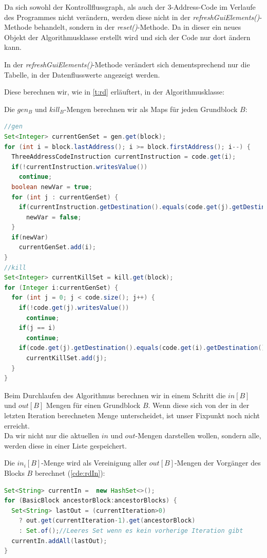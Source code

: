 Da sich sowohl der Kontrollflussgraph, als auch der 3-Address-Code im
Verlaufe des Programmes nicht verändern, werden diese nicht in der
\textit{refreshGuiElements()}-Methode behandelt, sondern in der \textit{reset()}-Methode.
Da in dieser ein neues Objekt der Algorithmusklasse erstellt wird und
sich der Code nur dort ändern kann.

In der \textit{refreshGuiElements()}-Methode verändert sich dementsprechend
nur die Tabelle, in der Datenflusswerte angezeigt werden.

Diese berechnen wir, wie in \cref{t:rd} erläuftert, in der Algorithmusklasse:

Die $gen_B$ und $kill_B$-Mengen berechnen wir als Maps für jeden Grundblock $B$: 
\begin{lstlisting}[language=Java, caption={Berechnung einer $gen$ und $kill$-Menge}, label={cde:gen}]
//gen
Set<Integer> currentGenSet = gen.get(block);
for (int i = block.lastAddress(); i >= block.firstAddress(); i--) {
  ThreeAddressCodeInstruction currentInstruction = code.get(i);
  if(!currentInstruction.writesValue())
    continue;
  boolean newVar = true;
  for (int j : currentGenSet) {
    if(currentInstruction.getDestination().equals(code.get(j).getDestination()))
      newVar = false;
  }
  if(newVar)
    currentGenSet.add(i);
}
//kill
Set<Integer> currentKillSet = kill.get(block);
for (Integer i:currentGenSet) {
  for (int j = 0; j < code.size(); j++) {
    if(!code.get(j).writesValue())
      continue;
    if(j == i)
      continue;
    if(code.get(j).getDestination().equals(code.get(i).getDestination()))
      currentKillSet.add(j);
  }
}
\end{lstlisting}

Beim Durchlaufen des Algorithmus berechnen wir
in einem Schritt die $in[B]$ und $out[B]$ Mengen für einen Grundblock $B$.
Wenn diese sich von der in der letzten Iteration berechneten Menge
unterscheidet, ist unser Fixpunkt noch nicht erreicht.\\

Da wir nicht nur die aktuellen $in$ und $out$-Mengen darstellen wollen,
sondern alle, werden diese in einer Liste gespeichert.

Die $in_i[B]$-Menge wird als Vereinigung aller $out[B]$-Mengen der Vorgänger
des Blocks $B$ berechnet (\cref{cde:rdIn}):
\begin{lstlisting}[language=Java, caption={Berechnen der $in$-Menge}, label={cde:rdIn}]
Set<String> currentIn =  new HashSet<>();
for (BasicBlock ancestorBlock:ancestorBlocks) {
  Set<String> lastOut = (currentIteration>0) 
    ? out.get(currentIteration-1).get(ancestorBlock)
    : Set.of();//Leeres Set wenn es kein vorherige Iteration gibt
  currentIn.addAll(lastOut);
}
\end{lstlisting}

